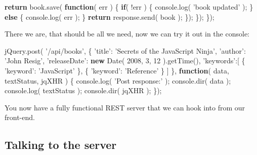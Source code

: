 \documentclass[9pt]{book}
\newenvironment{Shaded}{}{}
\newcommand{\KeywordTok}[1]{\textcolor[rgb]{0.00,0.44,0.13}{\textbf{{#1}}}}
\newcommand{\DecValTok}[1]{\textcolor[rgb]{0.25,0.63,0.44}{{#1}}}
\newcommand{\StringTok}[1]{\textcolor[rgb]{0.25,0.44,0.63}{{#1}}}
\newcommand{\OtherTok}[1]{\textcolor[rgb]{0.00,0.44,0.13}{{#1}}}
\newcommand{\FunctionTok}[1]{\textcolor[rgb]{0.02,0.16,0.49}{{#1}}}
\newcommand{\NormalTok}[1]{{#1}}
\begin{document}
\begin{Shaded}
\begin{Highlighting}[]
        \KeywordTok{return} \OtherTok{book}\NormalTok{.}\FunctionTok{save}\NormalTok{( }\KeywordTok{function}\NormalTok{( err ) \{}
            \KeywordTok{if}\NormalTok{( !err ) \{}
                \OtherTok{console}\NormalTok{.}\FunctionTok{log}\NormalTok{( }\StringTok{'book updated'} \NormalTok{);}
            \NormalTok{\} }\KeywordTok{else} \NormalTok{\{}
                \OtherTok{console}\NormalTok{.}\FunctionTok{log}\NormalTok{( err );}
            \NormalTok{\}}
            \KeywordTok{return} \OtherTok{response}\NormalTok{.}\FunctionTok{send}\NormalTok{( book );}
        \NormalTok{\});}
    \NormalTok{\});}
\NormalTok{\});}
\end{Highlighting}
\end{Shaded}

There we are, that should be all we need, now we can try it out in the
console:

\begin{Shaded}
\begin{Highlighting}[]
\OtherTok{jQuery}\NormalTok{.}\FunctionTok{post}\NormalTok{( }\StringTok{'/api/books'}\NormalTok{, \{}
    \StringTok{'title'}\NormalTok{: }\StringTok{'Secrets of the JavaScript Ninja'}\NormalTok{,}
    \StringTok{'author'}\NormalTok{: }\StringTok{'John Resig'}\NormalTok{,}
    \StringTok{'releaseDate'}\NormalTok{: }\KeywordTok{new} \FunctionTok{Date}\NormalTok{( }\DecValTok{2008}\NormalTok{, }\DecValTok{3}\NormalTok{, }\DecValTok{12} \NormalTok{).}\FunctionTok{getTime}\NormalTok{(),}
    \StringTok{'keywords'}\NormalTok{:[}
        \NormalTok{\{ }\StringTok{'keyword'}\NormalTok{: }\StringTok{'JavaScript'} \NormalTok{\},}
        \NormalTok{\{ }\StringTok{'keyword'}\NormalTok{: }\StringTok{'Reference'} \NormalTok{\}}
    \NormalTok{]}
\NormalTok{\}, }\KeywordTok{function}\NormalTok{( data, textStatus, jqXHR ) \{}
    \OtherTok{console}\NormalTok{.}\FunctionTok{log}\NormalTok{( }\StringTok{'Post response:'} \NormalTok{);}
    \OtherTok{console}\NormalTok{.}\FunctionTok{dir}\NormalTok{( data );}
    \OtherTok{console}\NormalTok{.}\FunctionTok{log}\NormalTok{( textStatus );}
    \OtherTok{console}\NormalTok{.}\FunctionTok{dir}\NormalTok{( jqXHR );}
\NormalTok{\});}
\end{Highlighting}
\end{Shaded}

You now have a fully functional REST server that we can hook into from
our front-end.

\subsection{Talking to the server}\label{talking-to-the-server}
\end{document}
